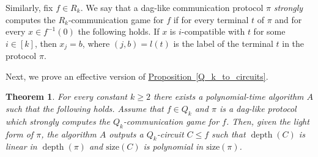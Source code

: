 \documentclass[11pt]{article}
\numberwithin{equation}{section}
\newtheorem{theorem}{Theorem}[section]
\theoremstyle{definition}
\theoremstyle{plain}
\newcommand{\expref}[2]{\hyperref[#2]{#1~\ref{#2}}}
\DeclareMathOperator{\depth}{depth}  %
\begin{document}
Similarly, fix $f\in R_k$. We say that a dag-like communication protocol $\pi$ \emph{strongly} computes the $R_k$-communication game for $f$ if for every terminal $t$ of $\pi$ and for every $x\in f^{-1}(0)$ the following holds. If $x$ is $i$-compatible with $t$ for some $i\in [k]$, then $x_j = b$, where $(j, b) = l(t)$ is the label of the terminal $t$ in the protocol $\pi$.



Next, we prove an effective version of \expref{Proposition}{Q_k_to_circuits}.
\begin{theorem}
\label{efficient_Q_k}
For every constant $k\ge 2$ there exists  a polynomial-time algorithm $A$ such that the following holds. Assume that $f\in Q_k$ and $\pi$ is a dag-like protocol which strongly computes  the $Q_k$-communication game for $f$. Then, given the light form of $\pi$, the algorithm $A$ outputs a $Q_k$-circuit $C \le f$ such that $\depth(C)$ is linear in $\depth(\pi)$ and $\mathrm{size}(C)$ is polynomial in $\mathrm{size}(\pi)$. 
\end{theorem}
\end{document}

